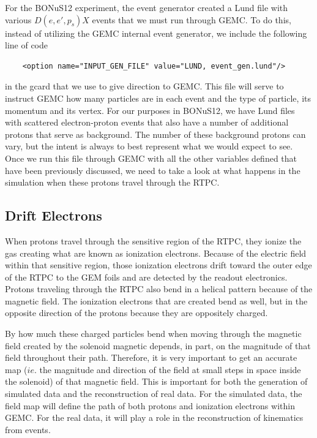 For the BONuS12 experiment, the event generator created a Lund file with various $D(e,e',p_s)X$ events that we must run through GEMC. To do this, instead of utilizing the GEMC internal event generator, we include the following line of code
\begin{lstlisting}
	<option name="INPUT_GEN_FILE" value="LUND, event_gen.lund"/>
\end{lstlisting}
in the gcard that we use to give direction to GEMC. This file will serve to instruct GEMC how many particles are in each event and the type of particle, its momentum and its vertex. For our purposes in BONuS12, we have Lund files with scattered electron-proton events that also have a number of additional protons that serve as background. The number of these background protons can vary, but the intent is always to best represent what we would expect to see. Once we run this file through GEMC with all the other variables defined that have been previously discussed, we need to take a look at what happens in the simulation when these protons travel through the RTPC.

\subsection{Drift Electrons} \label{ss:drift_e}
When protons travel through the sensitive region of the RTPC, they ionize the gas creating what are known as ionization electrons. Because of the electric field within that sensitive region, those ionization electrons drift toward the outer edge of the RTPC to the GEM foils and are detected by the readout electronics. Protons traveling through the RTPC also bend in a helical pattern because of the magnetic field. The ionization electrons that are created bend as well, but in the opposite direction of the protons because they are oppositely charged.
  
By how much these charged particles bend when moving through the magnetic field created by the solenoid magnetic depends, in part, on the magnitude of that field throughout their path. Therefore, it is very important to get an accurate map ($ie.$ the magnitude and direction of the field at small steps in space inside the solenoid) of that magnetic field. This is important for both the generation of simulated data and the reconstruction of real data. For the simulated data, the field map will define the path of both protons and ionization electrons within GEMC. For the real data, it will play a role in the reconstruction of kinematics from events.

